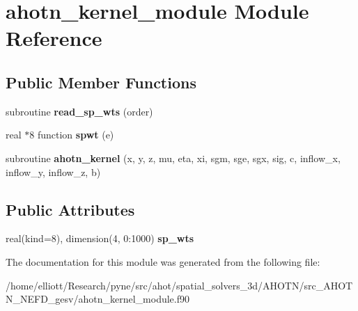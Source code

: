\hypertarget{classahotn__kernel__module}{\section{ahotn\-\_\-kernel\-\_\-module Module Reference}
\label{classahotn__kernel__module}
}
\subsection*{Public Member Functions}
\begin{DoxyCompactItemize}
\item 
\hypertarget{classahotn__kernel__module_a0020d1d5b3a3b3531a8558a277021df7}{subroutine {\bfseries read\-\_\-sp\-\_\-wts} (order)}\label{classahotn__kernel__module_a0020d1d5b3a3b3531a8558a277021df7}

\item 
\hypertarget{classahotn__kernel__module_a39dd68d19fb10ecf5cc99e3a985d9954}{real $\ast$8 function {\bfseries spwt} (e)}\label{classahotn__kernel__module_a39dd68d19fb10ecf5cc99e3a985d9954}

\item 
\hypertarget{classahotn__kernel__module_a63aa1d735806357cca2481808d55aa7a}{subroutine {\bfseries ahotn\-\_\-kernel} (x, y, z, mu, eta, xi, sgm, sge, sgx, sig, c, inflow\-\_\-x, inflow\-\_\-y, inflow\-\_\-z, b)}\label{classahotn__kernel__module_a63aa1d735806357cca2481808d55aa7a}

\end{DoxyCompactItemize}
\subsection*{Public Attributes}
\begin{DoxyCompactItemize}
\item 
\hypertarget{classahotn__kernel__module_abaac07572f901adbba93f9b955fb4e88}{real(kind=8), dimension(4, 0\-:1000) {\bfseries sp\-\_\-wts}}\label{classahotn__kernel__module_abaac07572f901adbba93f9b955fb4e88}

\end{DoxyCompactItemize}


The documentation for this module was generated from the following file\-:\begin{DoxyCompactItemize}
\item 
/home/elliott/\-Research/pyne/src/ahot/spatial\-\_\-solvers\-\_\-3d/\-A\-H\-O\-T\-N/src\-\_\-\-A\-H\-O\-T\-N\-\_\-\-N\-E\-F\-D\-\_\-gesv/ahotn\-\_\-kernel\-\_\-module.\-f90\end{DoxyCompactItemize}

